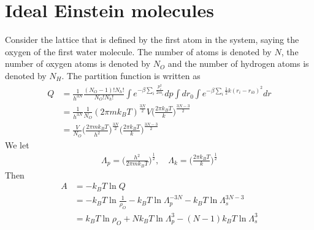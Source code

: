\documentclass[aps,pre,a4paper,showkeys,fleqn]{revtex4}
\begin{document}
\section{Ideal Einstein molecules}
Consider the lattice that is defined by the first atom in the system, saying the oxygen of the first water molecule.
The number of atoms is denoted by $N$, the number of oxygen atoms is denoted by $N_O$ and the number of hydrogen atoms is denoted by $N_H$.
The partition function is written as
\begin{align*}
  Q & = \frac{1}{h^{3N}}
      \frac{(N_O-1)!N_h!}{N_O!N_h!}
      \int e^{-\beta\sum_i\frac{p_i^2}{2m_i}} dp
      \int dr_0\int e^{-\beta\sum_i \frac 12k(r_i - r_{i0})^2} dr \\
    &=
      \frac{1}{h^{3N}}\frac{1}{N_O}
      (2\pi m k_BT)^{\frac{3N}{2}}
      {V}
      \Big(\frac{2\pi k_BT}{k}\Big)^{\frac{3N-3}2} \\
    &=
      \frac{V}{N_O}
      \Big( \frac{2\pi m k_BT}{h^2} \Big)^{\frac{3N}{2}}
      \Big( \frac{2\pi k_BT}{k} \Big)^{\frac{3N-3}{2}}
\end{align*}
We let
\begin{align*}
  \Lambda_p = \Big(\frac{h^2}{2\pi m k_BT}\Big)^{\frac12}, \quad \Lambda_k = \Big(\frac{2\pi k_BT}{k}\Big)^{\frac12}
\end{align*}
Then
\begin{align*}
  A
  &=
    -k_BT \ln Q \\
  &=
    -k_BT \ln \frac1{\rho_O} - k_BT \ln \Lambda_p^{-3N} - k_BT \ln \Lambda_s^{3N-3} \\
  &=
    k_BT \ln {\rho_O} + Nk_BT \ln \Lambda_p^3 - (N-1) k_BT \ln \Lambda_s^3
\end{align*}
\end{document}
